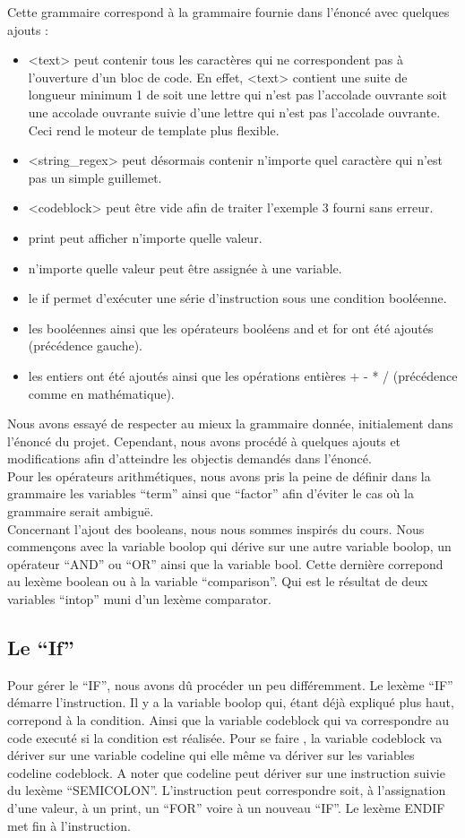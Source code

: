 \documentclass[10pt,a4paper]{article}
\begin{document}
	Cette grammaire correspond à la grammaire fournie dans l'énoncé avec quelques ajouts :
	\begin{itemize}
		\item <text> peut contenir tous les caractères qui ne correspondent pas à l'ouverture d'un bloc de code. En effet, <text> contient une suite de longueur minimum 1 de soit une lettre qui n'est pas l'accolade ouvrante soit une accolade ouvrante suivie d'une lettre qui n'est pas l'accolade ouvrante. Ceci rend le moteur de template plus flexible.
		\item <string\_regex> peut désormais contenir n'importe quel caractère qui n'est pas un simple guillemet.
		\item <codeblock> peut être vide afin de traiter l'exemple 3 fourni sans erreur.
		\item print peut afficher n'importe quelle valeur.
		\item n'importe quelle valeur peut être assignée à une variable.
		\item le if permet d'exécuter une série d'instruction sous une condition booléenne.
		\item les booléennes ainsi que les opérateurs booléens and et for ont été ajoutés (précédence gauche).
		\item les entiers ont été ajoutés ainsi que les opérations entières + - * / (précédence comme en mathématique).
		
		
	\end{itemize}
	
	
	
	
	Nous avons essayé de respecter au mieux la grammaire donnée, initialement dans l'énoncé du projet.
	Cependant, nous avons procédé à quelques ajouts et modifications afin d'atteindre les objectis demandés dans 
	l'énoncé.\\
	Pour les opérateurs arithmétiques, nous avons pris la peine de définir dans la grammaire les variables ``term'' ainsi que ``factor'' afin d'éviter
	le cas où la grammaire serait ambiguë.\\
	Concernant l'ajout des booleans, nous nous sommes inspirés du cours. Nous commençons avec la variable boolop qui dérive sur une autre variable
	boolop, un opérateur ``AND'' ou ``OR'' ainsi que la variable bool. Cette dernière correpond au lexème boolean ou à la variable ``comparison''.
	Qui est le résultat de deux variables ``intop'' muni d'un lexème comparator.
	\subsection{Le ``If''}
	Pour gérer le ``IF'', nous avons dû procéder un peu différemment. Le lexème ``IF'' démarre l'instruction. Il y a la variable boolop qui, 
	étant déjà expliqué plus haut, correpond à la condition.
	Ainsi que la variable codeblock qui va correspondre au code executé si la condition est réalisée. Pour se faire , la variable codeblock va dériver
	sur une variable codeline qui elle même va dériver sur les variables codeline codeblock. A noter que codeline peut dériver sur une instruction
	suivie du lexème ``SEMICOLON''. L'instruction peut correspondre soit, à l'assignation d'une valeur, à un print, un ``FOR'' voire à un nouveau ``IF''.
	Le lexème ENDIF met fin à l'instruction.
	\\
\end{document}
